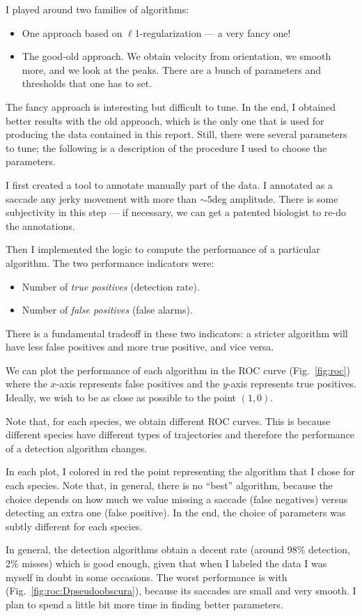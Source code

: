 
I played around two families of algorithms:
\begin{itemize}
	\item One approach based on $\ell$1-regularization --- a very fancy one! 
	\item The good-old approach. We obtain velocity from orientation, we smooth more, and we look at the peaks. There are a bunch of parameters and thresholds that one has to set.
\end{itemize}
The fancy approach is interesting but difficult to tune. In the end, I obtained better results with the old approach, which is the only one that is used for producing the data contained in this report.  Still, there were several parameters to tune;
the following is a description of the procedure I used to choose the parameters.

\medskip
I first created a tool to annotate manually part of the data. 
I annotated as a saccade any jerky movement with more than $\sim5$deg amplitude. 
There is some subjectivity in this step --- if necessary, we can get a patented biologist to re-do the annotations.

Then I implemented the logic to compute the performance of a particular algorithm.
The two performance indicators were:
\begin{itemize}
	\item Number of \emph{true positives} (detection rate).
	\item Number of \emph{false positives} (false alarms).
\end{itemize}
There is a fundamental tradeoff in these two indicators: a stricter algorithm will have less false positives and more true positive, and vice versa.

We can plot the performance of each algorithm in the ROC curve (Fig.~\vref{fig:roc}) where the $x$-axis represents false positives and the $y$-axis represents true positives. Ideally, we wish to be as close as possible to the point $(1,0)$.

Note that, for each species, we obtain different ROC curves. This is because different species have different types of trajectories and therefore the performance of a detection algorithm changes. 

In each plot, I colored in red the point representing the algorithm that I chose for each species. Note that, in general, there is no ``best'' algorithm, because the choice depends on how much we value missing a saccade (false negatives) versus detecting an extra one (false positive). In the end, the choice of parameters was subtly different for each species.

In general, the detection algorithms obtain a decent rate (around 98\% detection, 2\% misses) which is good enough, given that when I labeled the data I was myself in doubt in some occasions.
The worst performance is with \Dpseudoobscura (Fig.~\ref{fig:roc:Dpseudoobscura}), because its saccades are small and very smooth. I plan to spend a little bit more time in finding better parameters.

